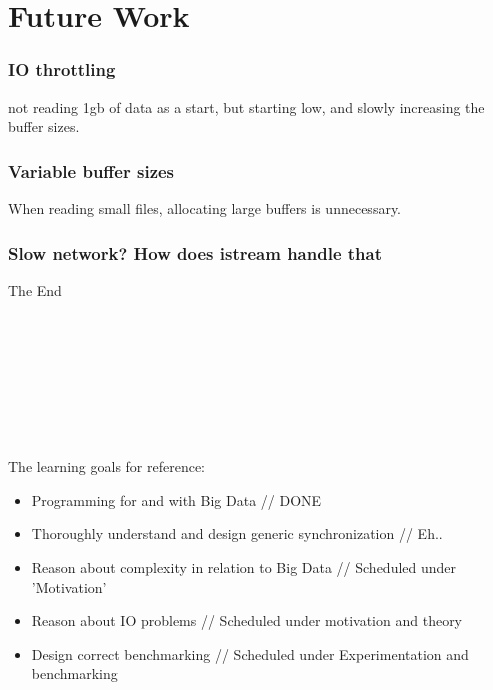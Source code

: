 \documentclass[a4paper]{article}
\begin{document}
\section{Future Work}
\subsubsection{IO throttling}
not reading 1gb of data as a start, but starting low, and slowly increasing the buffer sizes.

\subsubsection{Variable buffer sizes}
When reading small files, allocating large buffers is unnecessary.

\subsubsection{Slow network? How does istream handle that}





The End \\\\\\\\\\\\\\\\\\

The learning goals for reference:

\begin{itemize}
  \item Programming for and with Big Data  // DONE
  \item Thoroughly understand and design generic synchronization  // Eh..
  \item Reason about complexity in relation to Big Data // Scheduled under 'Motivation'
  \item Reason about IO problems  // Scheduled under motivation and theory
  \item Design correct benchmarking  // Scheduled under Experimentation and benchmarking
\end{itemize}
\end{document}
